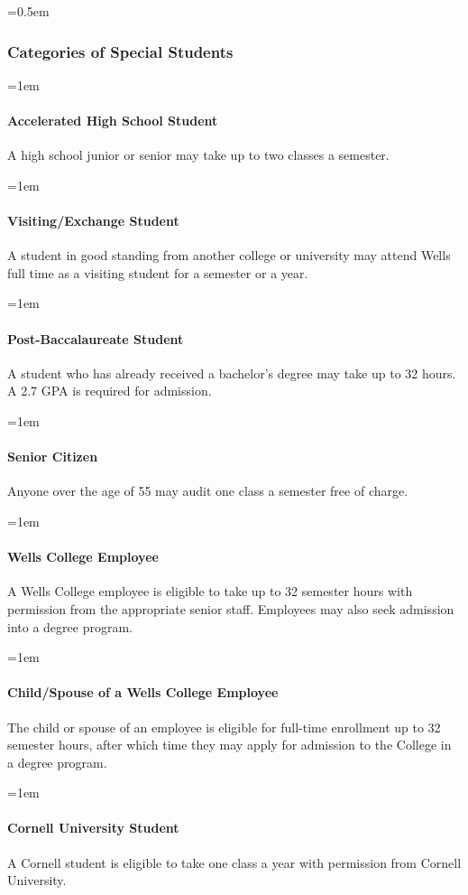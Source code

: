 \documentclass{manual}
\let\oldsubsubsection\subsubsection
\renewcommand\subsubsection{\leftskip=0.5em\oldsubsubsection}
\let\oldparagraph\paragraph
\renewcommand\paragraph{\leftskip=1em\oldparagraph}
\begin{document}
\subsubsection{Categories of Special Students}\label{sub:CategoriesOfSpecialStudents}


\paragraph{Accelerated High School Student} A high school junior or senior may take up to two classes a semester.

\paragraph{Visiting/Exchange Student} A student in good standing from another college or university may attend Wells full time as a visiting student for a semester or a year.

\paragraph{Post-Baccalaureate Student} A student who has already received a bachelor's degree may take up to 32 hours. A 2.7 GPA is required for admission. 

\paragraph{Senior Citizen} Anyone over the age of 55 may audit one class a semester free of charge.




\paragraph{Wells College Employee}\label{par:employeeClasses} A Wells College employee is eligible to take up to 32 semester hours with permission from the appropriate senior staff. Employees may also seek admission into a degree program.


\paragraph{Child/Spouse of a Wells College Employee}\label{par:spouseClasses} The child or spouse of an employee is eligible for full-time enrollment up to 32 semester hours, after which time they may apply for admission to the College in a degree program.


\paragraph{Cornell University Student} A Cornell student is eligible to take one class a year with permission from Cornell University.
\end{document}
